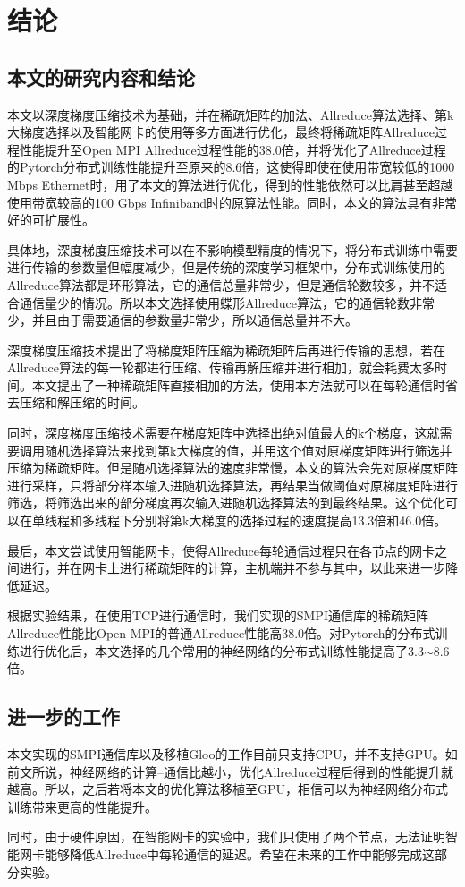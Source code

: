 \chapter{结论}
\label{chap5}

\section{本文的研究内容和结论}
本文以深度梯度压缩技术为基础，并在稀疏矩阵的加法、Allreduce算法选择、第k大梯度选择以及智能网卡的使用等多方面进行优化，最终将稀疏矩阵Allreduce过程性能提升至Open MPI Allreduce过程性能的38.0倍，并将优化了Allreduce过程的Pytorch分布式训练性能提升至原来的8.6倍，这使得即使在使用带宽较低的1000 Mbps Ethernet时，用了本文的算法进行优化，得到的性能依然可以比肩甚至超越使用带宽较高的100 Gbps Infiniband时的原算法性能。同时，本文的算法具有非常好的可扩展性。

具体地，深度梯度压缩技术可以在不影响模型精度的情况下，将分布式训练中需要进行传输的参数量但幅度减少，但是传统的深度学习框架中，分布式训练使用的Allreduce算法都是环形算法，它的通信总量非常少，但是通信轮数较多，并不适合通信量少的情况。所以本文选择使用蝶形Allreduce算法，它的通信轮数非常少，并且由于需要通信的参数量非常少，所以通信总量并不大。

深度梯度压缩技术提出了将梯度矩阵压缩为稀疏矩阵后再进行传输的思想，若在Allreduce算法的每一轮都进行压缩、传输再解压缩并进行相加，就会耗费太多时间。本文提出了一种稀疏矩阵直接相加的方法，使用本方法就可以在每轮通信时省去压缩和解压缩的时间。

同时，深度梯度压缩技术需要在梯度矩阵中选择出绝对值最大的k个梯度，这就需要调用随机选择算法来找到第k大梯度的值，并用这个值对原梯度矩阵进行筛选并压缩为稀疏矩阵。但是随机选择算法的速度非常慢，本文的算法会先对原梯度矩阵进行采样，只将部分样本输入进随机选择算法，再结果当做阈值对原梯度矩阵进行筛选，将筛选出来的部分梯度再次输入进随机选择算法的到最终结果。这个优化可以在单线程和多线程下分别将第k大梯度的选择过程的速度提高13.3倍和46.0倍。

最后，本文尝试使用智能网卡，使得Allreduce每轮通信过程只在各节点的网卡之间进行，并在网卡上进行稀疏矩阵的计算，主机端并不参与其中，以此来进一步降低延迟。

根据实验结果，在使用TCP进行通信时，我们实现的SMPI通信库的稀疏矩阵Allreduce性能比Open MPI的普通Allreduce性能高38.0倍。对Pytorch的分布式训练进行优化后，本文选择的几个常用的神经网络的分布式训练性能提高了3.3$\sim$8.6倍。

\section{进一步的工作}
本文实现的SMPI通信库以及移植Gloo的工作目前只支持CPU，并不支持GPU。如前文所说，神经网络的计算--通信比越小，优化Allreduce过程后得到的性能提升就越高。所以，之后若将本文的优化算法移植至GPU，相信可以为神经网络分布式训练带来更高的性能提升。

同时，由于硬件原因，在智能网卡的实验中，我们只使用了两个节点，无法证明智能网卡能够降低Allreduce中每轮通信的延迟。希望在未来的工作中能够完成这部分实验。